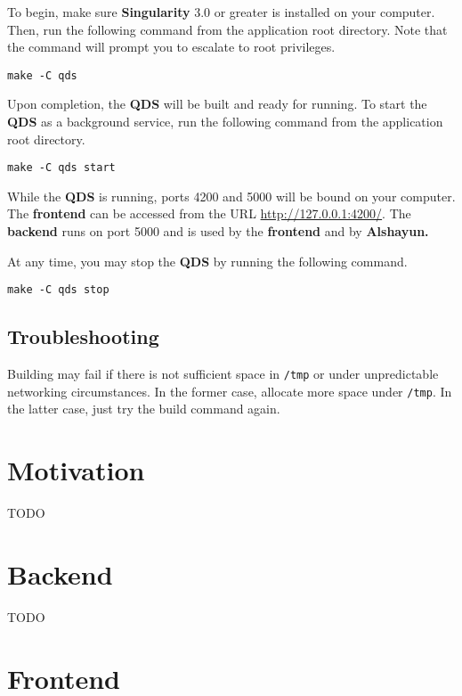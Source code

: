 \documentclass[12pt]{report}
\begin{document}
To begin, make sure \textbf{Singularity} 3.0 \cite{singularity3inst} or greater
is installed on your computer. Then, run the following command from the
application root directory. Note that the command will prompt you to escalate to
root privileges.

\begin{verbatim}
make -C qds
\end{verbatim}

Upon completion, the \textbf{QDS} will be built and ready for running. To start
the \textbf{QDS} as a background service, run the following command from the
application root directory.

\begin{verbatim}
make -C qds start
\end{verbatim}

While the \textbf{QDS} is running, ports 4200 and 5000 will be bound on your
computer. The \textbf{frontend} can be accessed from the URL
\url{http://127.0.0.1:4200/}. The \textbf{backend} runs on port 5000 and is used
by the \textbf{frontend} and by \textbf{Alshayun.}

At any time, you may stop the \textbf{QDS} by running the following command.

\begin{verbatim}
make -C qds stop
\end{verbatim}

        \subsection{Troubleshooting}

Building may fail if there is not sufficient space in \texttt{/tmp} or under
unpredictable networking circumstances. In the former case, allocate more space
under \texttt{/tmp}. In the latter case, just try the build command again.

    \section{Motivation}

TODO

    \section{Backend}

TODO

    \section{Frontend}
\end{document}

